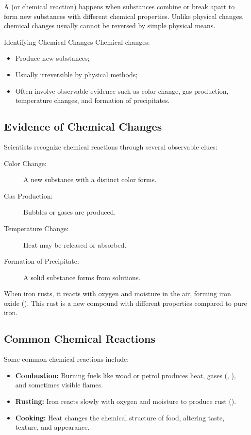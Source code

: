 A  (or chemical reaction) happens when substances combine or break apart to form new substances with different chemical properties. Unlike physical changes, chemical changes usually cannot be reversed by simple physical means.

\begin{keyconcept}{Identifying Chemical Changes}
Chemical changes:
\begin{itemize}
    \item Produce new substances;
    \item Usually irreversible by physical methods;
    \item Often involve observable evidence such as color change, gas production, temperature changes, and formation of precipitates.
\end{itemize}
\end{keyconcept}

\subsection{Evidence of Chemical Changes}

Scientists recognize chemical reactions through several observable clues:

\begin{description}
    \item[Color Change:] A new substance with a distinct color forms.
    \item[Gas Production:] Bubbles or gases are produced.
    \item[Temperature Change:] Heat may be released or absorbed.
    \item[Formation of Precipitate:] A solid substance forms from solutions.
\end{description}

\begin{example}
When iron rusts, it reacts with oxygen and moisture in the air, forming iron oxide (). This rust is a new compound with different properties compared to pure iron.
\end{example}

\subsection{Common Chemical Reactions}

Some common chemical reactions include:

\begin{itemize}
    \item \textbf{Combustion:} Burning fuels like wood or petrol produces heat, gases (, ), and sometimes visible flames.
    \item \textbf{Rusting:} Iron reacts slowly with oxygen and moisture to produce rust ().
    \item \textbf{Cooking:} Heat changes the chemical structure of food, altering taste, texture, and appearance.
\end{itemize}

